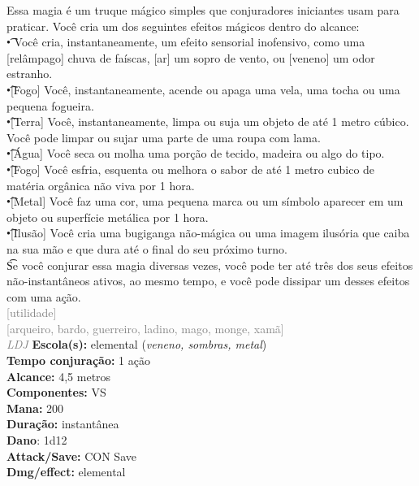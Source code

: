 \documentclass{RPG_Adventure}[2021/10/20]
\begin{document}
{\normalsize Essa magia é um truque mágico simples que conjuradores iniciantes usam para praticar. Você cria um dos seguintes efeitos mágicos dentro do alcance:\\\t • Você cria, instantaneamente, um efeito sensorial inofensivo, como uma [relâmpago] chuva de faíscas, [ar] um sopro de vento, ou [veneno] um odor estranho.\\\t •[Fogo] Você, instantaneamente, acende ou apaga uma vela, uma tocha ou uma pequena fogueira.\\\t •[Terra] Você, instantaneamente, limpa ou suja um objeto de até 1 metro cúbico. Você pode limpar ou sujar uma parte de uma roupa com lama.\\\t •[Água] Você seca ou molha uma porção de tecido, madeira ou algo do tipo.\\\t •[Fogo] Você esfria, esquenta ou melhora o sabor de até 1 metro cubico de matéria orgânica não viva por 1 hora.\\\t •[Metal] Você faz uma cor, uma pequena marca ou um símbolo aparecer em um objeto ou superfície metálica por 1 hora.\\\t •[Ilusão] Você cria uma bugiganga não-mágica ou uma imagem ilusória que caiba na sua mão e que dura até o final do seu próximo turno.\\\t Se você conjurar essa magia diversas vezes, você pode ter até três dos seus efeitos não-instantâneos ativos, ao mesmo tempo, e você pode dissipar um desses efeitos com uma ação.\\}
{\scriptsize \textcolor{gray}{[utilidade]\\}}
{\scriptsize \textcolor{gray}{[arqueiro, bardo, guerreiro, ladino, mago, monge, xamã]\\}}
{\tiny \textcolor{gray}{\textit{LDJ}}}\jump{}
{\small \t \textbf{Escola(s):} elemental (\textit{veneno, sombras, metal})\\\t \textbf{Tempo conjuração:} 1 ação\\\t \textbf{Alcance:} 4,5 metros\\\t \textbf{Componentes:} VS\\\t \textbf{Mana:} 200\\\t \textbf{Duração:} instantânea\\\t \textbf{Dano}: 1d12\\\t \textbf{Attack/Save:} CON Save\\\t \textbf{Dmg/effect:} elemental\\}
\end{document}
